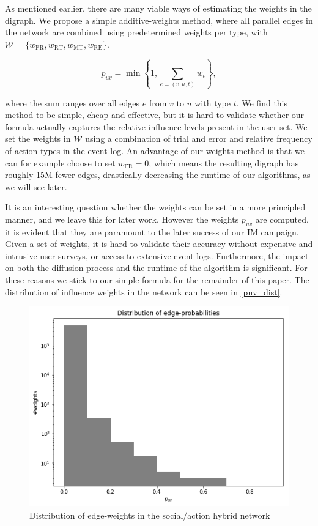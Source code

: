 \documentclass[sigconf]{acmart}
\begin{document}
As mentioned earlier, there are many viable ways of estimating the weights in the digraph. We propose a simple additive-weights method, where all parallel edges in the network are combined using predetermined weights per type, with \hspace{0.02cm}$\mathcal{W} = \{w_{\text{FR}}, w_{\text{RT}}, w_{\text{MT}}, w_{\text{RE}}\}$.

\begin{equation}
p_{uv} = \min \left\{1, \sum_{e = (v, u, t)}w_t \right\},
\end{equation}

where the sum ranges over all edges $e$ from $v$ to $u$ with type $t$. We find this method to be simple, cheap and effective, but it is hard to validate whether our formula actually captures the relative influence levels present in the user-set. We set the weights in $\mathcal{W}$ using a combination of trial and error and relative frequency of action-types in the event-log. An advantage of our weights-method is that we can for example choose to set $w_{\text{FR}} = 0$, which means the resulting digraph has roughly 15M fewer edges, drastically decreasing the runtime of our algorithms, as we will see later. 

It is an interesting question whether the weights can be set in a more principled manner, and we leave this for later work. However the weights $p_{uv}$ are computed, it is evident that they are paramount to the later success of our IM campaign. Given a set of weights, it is hard to validate their accuracy without expensive and intrusive user-surveys, or access to extensive event-logs. Furthermore, the impact on both the diffusion process and the runtime of the algorithm is significant. For these reasons we stick to our simple formula for the remainder of this paper. The distribution of influence weights in the network can be seen in \autoref{puv_dist}. 

\begin{figure}[htbp]
\begin{center}
\includegraphics[width=\linewidth]{Figures/puv_dist.png}
\caption{Distribution of edge-weights in the social/action hybrid network}
\label{puv_dist}
\end{center}
\end{figure}
\end{document}
